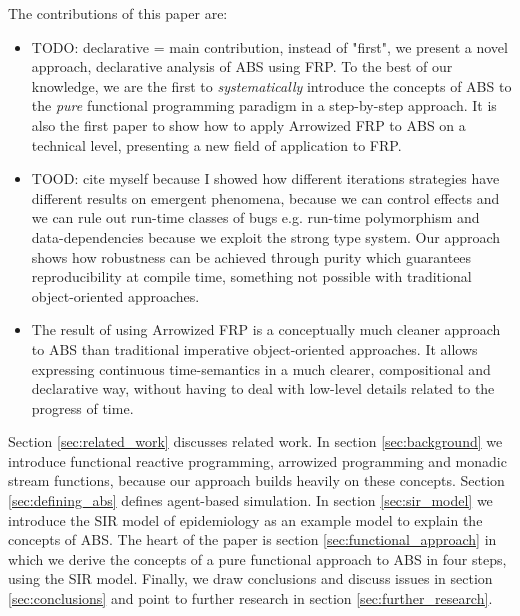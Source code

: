 The contributions of this paper are:
\begin{itemize}
	\item TODO: declarative = main contribution, instead of "first", we present a novel approach, declarative analysis of ABS using FRP. To the best of our knowledge, we are the first to \textit{systematically} introduce the concepts of ABS to the \textit{pure} functional programming paradigm in a step-by-step approach. It is also the first paper to show how to apply Arrowized FRP to ABS on a technical level, presenting a new field of application to FRP.
	\item TOOD: cite myself because I showed how different iterations strategies have different results on emergent phenomena,  because we can control effects and we can rule out run-time classes of bugs e.g. run-time polymorphism and data-dependencies because we exploit the strong type system. Our approach shows how robustness can be achieved through purity which guarantees reproducibility at compile time, something not possible with traditional object-oriented approaches.
	\item The result of using Arrowized FRP is a conceptually much cleaner approach to ABS than traditional imperative object-oriented approaches. It allows expressing continuous time-semantics in a much clearer, compositional and declarative way, without having to deal with low-level details related to the progress of time.
\end{itemize}

Section \ref{sec:related_work} discusses related work. In section \ref{sec:background} we introduce functional reactive programming, arrowized programming and monadic stream functions, because our approach builds heavily on these concepts. Section \ref{sec:defining_abs} defines agent-based simulation. In section \ref{sec:sir_model} we introduce the SIR model of epidemiology as an example model to explain the concepts of ABS. The heart of the paper is section \ref{sec:functional_approach} in which we derive the concepts of a pure functional approach to ABS in four steps, using the SIR model. Finally, we draw conclusions and discuss issues in section \ref{sec:conclusions} and point to further research in section \ref{sec:further_research}.

